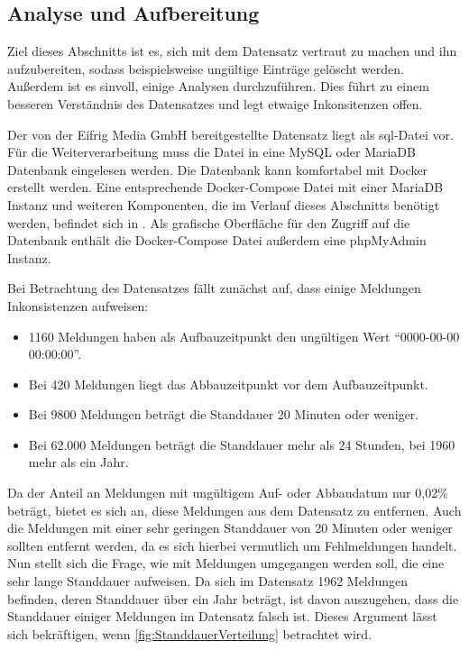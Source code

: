 \subsection{Analyse und Aufbereitung}
\label{sec:AnalyseAufbereitung}

Ziel dieses Abschnitts ist es, sich mit dem Datensatz vertraut zu machen und ihn aufzubereiten, sodass beispielsweise ungültige Einträge gelöscht werden.
Außerdem ist es sinvoll, einige Analysen durchzuführen.
Dies führt zu einem besseren Verständnis des Datensatzes und legt etwaige Inkonsitenzen offen.

Der von der Eifrig Media GmbH bereitgestellte Datensatz liegt als sql-Datei vor.
Für die Weiterverarbeitung muss die Datei in eine MySQL oder MariaDB Datenbank eingelesen werden.
Die Datenbank kann komfortabel mit Docker erstellt werden.
Eine entsprechende Docker-Compose Datei mit einer MariaDB Instanz und weiteren Komponenten, die im Verlauf dieses Abschnitts benötigt werden, befindet sich in .
Als grafische Oberfläche für den Zugriff auf die Datenbank enthält die Docker-Compose Datei außerdem eine phpMyAdmin Instanz.

Bei Betrachtung des Datensatzes fällt zunächst auf, dass einige Meldungen Inkonsistenzen aufweisen:

\begin{itemize}
    \setlength\itemsep{-15pt}
    \item 1160 Meldungen haben als Aufbauzeitpunkt den ungültigen Wert "`0000-00-00 00:00:00"'.
    \item Bei 420 Meldungen liegt das Abbauzeitpunkt vor dem Aufbauzeitpunkt.
    \item Bei 9800 Meldungen beträgt die Standdauer 20 Minuten oder weniger.
    \item Bei 62.000 Meldungen beträgt die Standdauer mehr als 24 Stunden, bei 1960 mehr als ein Jahr.
\end{itemize}

Da der Anteil an Meldungen mit ungültigem Auf- oder Abbaudatum nur 0,02\% beträgt, bietet es sich an, diese Meldungen aus dem Datensatz zu entfernen.
Auch die Meldungen mit einer sehr geringen Standdauer von 20 Minuten oder weniger sollten entfernt werden, da es sich hierbei vermutlich um Fehlmeldungen handelt.
Nun stellt sich die Frage, wie mit Meldungen umgegangen werden soll, die eine sehr lange Standdauer aufweisen.
Da sich im Datensatz 1962 Meldungen befinden, deren Standdauer über ein Jahr beträgt, ist davon auszugehen, dass die Standdauer einiger Meldungen im Datensatz falsch ist.
Dieses Argument lässt sich bekräftigen, wenn \autoref{fig:StanddauerVerteilung} betrachtet wird.

